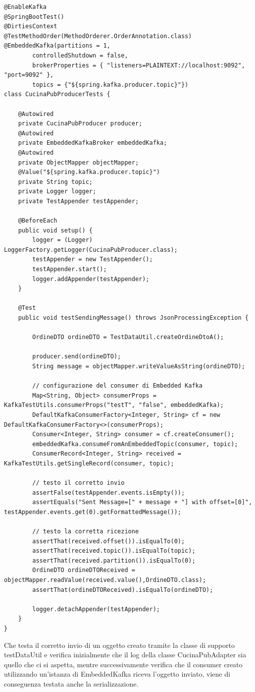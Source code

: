 \begin{lstlisting}[style=myJava, 
    caption={Test di integrazione per il producer CucinaPubProducer}, label=lst:CucinaPubProducerTest, 
    emph={[2] kafkaTemplate , objectMapper, topic, payload, log, producer, embeddedKafka, logger, testAppender },
    emphstyle={[2]\color{codeDarkMagenta}}]
@EnableKafka
@SpringBootTest()
@DirtiesContext
@TestMethodOrder(MethodOrderer.OrderAnnotation.class)
@EmbeddedKafka(partitions = 1,
        controlledShutdown = false,
        brokerProperties = { "listeners=PLAINTEXT://localhost:9092", "port=9092" },
        topics = {"${spring.kafka.producer.topic}"})
class CucinaPubProducerTests {

    @Autowired
    private CucinaPubProducer producer;
    @Autowired
    private EmbeddedKafkaBroker embeddedKafka;
    @Autowired
    private ObjectMapper objectMapper;
    @Value("${spring.kafka.producer.topic}")
    private String topic;
    private Logger logger;
    private TestAppender testAppender;

    @BeforeEach
    public void setup() {
        logger = (Logger) LoggerFactory.getLogger(CucinaPubProducer.class);
        testAppender = new TestAppender();
        testAppender.start();
        logger.addAppender(testAppender);
    }

    @Test
    public void testSendingMessage() throws JsonProcessingException {

        OrdineDTO ordineDTO = TestDataUtil.createOrdineDtoA();

        producer.send(ordineDTO);
        String message = objectMapper.writeValueAsString(ordineDTO);

        // configurazione del consumer di Embedded Kafka
        Map<String, Object> consumerProps = KafkaTestUtils.consumerProps("testT", "false", embeddedKafka);
        DefaultKafkaConsumerFactory<Integer, String> cf = new DefaultKafkaConsumerFactory<>(consumerProps);
        Consumer<Integer, String> consumer = cf.createConsumer();
        embeddedKafka.consumeFromAnEmbeddedTopic(consumer, topic);
        ConsumerRecord<Integer, String> received = KafkaTestUtils.getSingleRecord(consumer, topic);

        // testo il corretto invio
        assertFalse(testAppender.events.isEmpty());
        assertEquals("Sent Message=[" + message + "] with offset=[0]", testAppender.events.get(0).getFormattedMessage());

        // testo la corretta ricezione
        assertThat(received.offset()).isEqualTo(0);
        assertThat(received.topic()).isEqualTo(topic);
        assertThat(received.partition()).isEqualTo(0);
        OrdineDTO ordineDTOReceived = objectMapper.readValue(received.value(),OrdineDTO.class);
        assertThat(ordineDTOReceived).isEqualTo(ordineDTO);

        logger.detachAppender(testAppender);
    }
}
\end{lstlisting}
Che testa il corretto invio di un oggetto creato tramite la classe di supporto testDataUtil e verifica inizialmente che il log della classe CucinaPubAdapter sia quello che ci si aspetta, mentre successivamente verifica che il consumer creato utilizzando un’istanza di EmbeddedKafka riceva l’oggetto inviato, viene di conseguenza testata anche la serializzazione.

